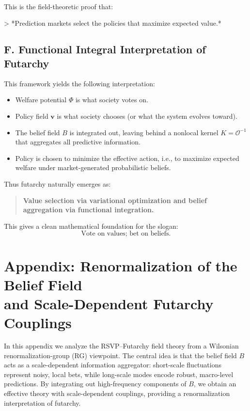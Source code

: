 \documentclass[12pt]{article}
\begin{document}
This is the field-theoretic proof that:

> *Prediction markets select the policies that maximize expected value.*

\subsection*{F. Functional Integral Interpretation of Futarchy}

This framework yields the following interpretation:

\begin{itemize}
    \item Welfare potential \(\Phi\) is what society votes on.  
    \item Policy field \(\mathbf{v}\) is what society chooses (or what the system evolves toward).  
    \item The belief field \(B\) is integrated out, leaving behind a nonlocal kernel \(K = \mathcal{O}^{-1}\) that aggregates all predictive information.  
    \item Policy is chosen to minimize the effective action, i.e., to maximize expected welfare under market-generated probabilistic beliefs.
\end{itemize}

Thus futarchy naturally emerges as:

\begin{quote}
\textbf{Value selection via variational optimization and belief aggregation via functional integration.}
\end{quote}

This gives a clean mathematical foundation for the slogan:
\[
\text{Vote on values; bet on beliefs.}
\]


\section*{Appendix: Renormalization of the Belief Field\\
and Scale-Dependent Futarchy Couplings}

In this appendix we analyze the RSVP--Futarchy field theory from a
Wilsonian renormalization-group (RG) viewpoint. The central idea is that
the belief field $B$ acts as a scale-dependent information aggregator:
short-scale fluctuations represent noisy, local bets, while long-scale
modes encode robust, macro-level predictions. By integrating out
high-frequency components of $B$, we obtain an effective theory with
scale-dependent couplings, providing a renormalization interpretation of
futarchy.
\end{document}
